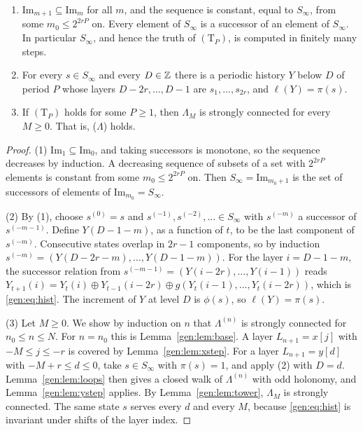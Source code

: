 \begin{proposition}\label{gen:prop:TP}
\begin{enumerate}
\item $\mathrm{Im}_{m+1}\subseteq\mathrm{Im}_m$ for all $m$, and the sequence is constant, equal to $S_\infty$, from some $m_0\le2^{2rP}$ on. Every element of $S_\infty$ is a successor of an element of $S_\infty$. In particular $S_\infty$, and hence the truth of $(\mathrm T_P)$, is computed in finitely many steps.
\item For every $s\in S_\infty$ and every $D\in\mathbb{Z}$ there is a periodic history $Y$ below $D$ of period $P$ whose layers $D-2r,\dots,D-1$ are $s_1,\dots,s_{2r}$, and $\ell(Y)=\pi(s)$.
\item If $(\mathrm T_P)$ holds for some $P\ge1$, then $\Lambda_M$ is strongly connected for every $M\ge0$. That is, ($\Lambda$) holds.
\end{enumerate}
\end{proposition}

\begin{proof}
(1) $\mathrm{Im}_1\subseteq\mathrm{Im}_0$, and taking successors is monotone, so the sequence decreases by induction. A decreasing sequence of subsets of a set with $2^{2rP}$ elements is constant from some $m_0\le2^{2rP}$ on. Then $S_\infty=\mathrm{Im}_{m_0+1}$ is the set of successors of elements of $\mathrm{Im}_{m_0}=S_\infty$.

(2) By (1), choose $s^{(0)}=s$ and $s^{(-1)},s^{(-2)},\dots\in S_\infty$ with $s^{(-m)}$ a successor of $s^{(-m-1)}$. Define $Y(D-1-m)$, as a function of $t$, to be the last component of $s^{(-m)}$. Consecutive states overlap in $2r-1$ components, so by induction $s^{(-m)}=(Y(D-2r-m),\dots,Y(D-1-m))$. For the layer $i=D-1-m$, the successor relation from $s^{(-m-1)}=(Y(i-2r),\dots,Y(i-1))$ reads $Y_{t+1}(i)=Y_t(i)\oplus Y_{t-1}(i-2r)\oplus g(Y_t(i-1),\dots,Y_t(i-2r))$, which is \eqref{gen:eq:hist}. The increment of $Y$ at level $D$ is $\phi(s)$, so $\ell(Y)=\pi(s)$.

(3) Let $M\ge0$. We show by induction on $n$ that $\Lambda^{(n)}$ is strongly connected for $n_0\le n\le N$. For $n=n_0$ this is Lemma~\ref{gen:lem:base}. A layer $L_{n+1}=x[j]$ with $-M\le j\le-r$ is covered by Lemma~\ref{gen:lem:xstep}. For a layer $L_{n+1}=y[d]$ with $-M+r\le d\le0$, take $s\in S_\infty$ with $\pi(s)=1$, and apply (2) with $D=d$. Lemma~\ref{gen:lem:loops} then gives a closed walk of $\Lambda^{(n)}$ with odd holonomy, and Lemma~\ref{gen:lem:ystep} applies. By Lemma~\ref{gen:lem:tower}, $\Lambda_M$ is strongly connected. The same state $s$ serves every $d$ and every $M$, because \eqref{gen:eq:hist} is invariant under shifts of the layer index.
\end{proof}

